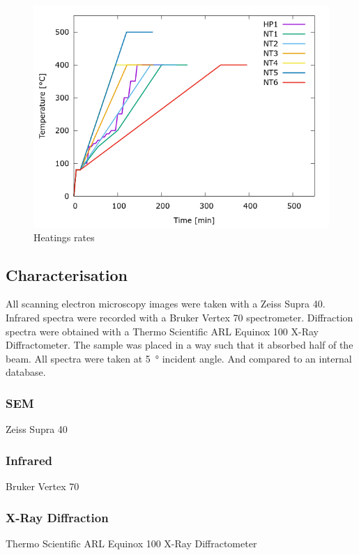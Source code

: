 \documentclass[a4paper]{article}
\begin{document}
\begin{figure}
	\centering
	\includegraphics[width=.7\textwidth]{../Data/Graphs/hp1.png}
	\caption{Heatings rates}
	\label{fig:heat}
\end{figure}

\subsection{Characterisation}
All scanning electron microscopy images were taken with a Zeiss Supra 40. 
%
Infrared spectra were recorded with a Bruker Vertex 70 spectrometer. 
%
Diffraction spectra were obtained with a Thermo Scientific ARL Equinox 100 X-Ray Diffractometer. 
The sample was placed in a way such that it absorbed half of the beam. 
All spectra were taken at \SI{5}{\degree} incident angle. 
And compared to an internal database.
\subsubsection{SEM}
Zeiss Supra 40
\subsubsection{Infrared}
Bruker Vertex 70
\subsubsection{X-Ray Diffraction}
Thermo Scientific ARL Equinox 100 X-Ray Diffractometer
\end{document}
